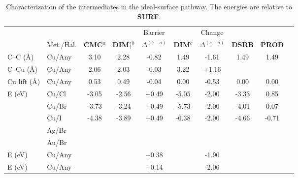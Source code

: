 \documentclass[aps,prl,reprint,amsmath,amssymb,floatfix,notitlepage]{revtex4-1}
\begin{document}
\begin{table*}
\centering
\caption{Characterization of the intermediates in the ideal-surface pathway. %
The energies are relative to \textbf{SURF}.
}
\label{table:idealsurface}
\begin{tabular}{ llcccccccc  }
 \hline
 \hline
  & & &  & Barrier & & Change & &\\
  & Met./Hal. & \textbf{CMC}$^{a}$ & \textbf{DIM$\ddagger$}$^{b}$ & $\Delta^{(b-a)}$ &  \textbf{DIM}$^{c}$ & $\Delta^{(c-a)}$  & \textbf{DSRB} & \textbf{PROD} \\ 
 \hline 
 C--C (\si{\angstrom}) & Cu/Any & 3.10 & 2.28 & -0.82 & 1.49 & -1.61 & 1.49 & 1.49 \\ 
 \hline
 C--Cu (\si{\angstrom}) & Cu/Any & 2.06 & 2.03 & -0.03 & 3.22 & +1.16 & & \\
 \hline
 Cu lift (\si{\angstrom}) & Cu/Any & 0.53 & 0.49& -0.04  & 0.00 & -0.53 & 0.00 & 0.00 \\
 \hline
 \multirow{3}{*}{E (\si{\electronvolt}) } & Cu/Cl & -3.05 &-2.56 &+0.49 & -5.05 & -2.00& -3.33&0.85\\ 
 & Cu/Br & -3.73 & -3.24 &+0.49 & -5.73 & -2.00& -4.01&0.07\\ 
 & Cu/I  & -4.38 & -3.89 & +0.49 & -6.38 & -2.00& -4.66&-0.71\\ 
 \hline
 & Ag/Br &  &  & &  & & & \\ 
 \hline
 & Au/Br &  &  & &  & & & \\ 
 \hline
 E (\si{\electronvolt})~\cite{pccp2010} & Cu/Any &  &  & +0.38& & -1.90 & & \\
 \hline
 E (\si{\electronvolt})~\cite{jacs2013} & Cu/Any & &  & +0.14& & -2.06 & &\\
 \hline
 \hline
\end{tabular}
\end{table*}
\end{document}
